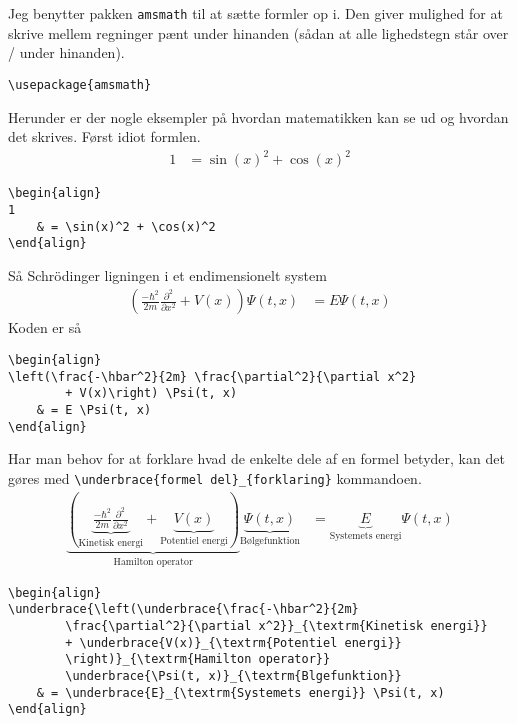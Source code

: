 \documentclass[11pt,a4paper,fleqn]{article}
\numberwithin{equation}{section}
\begin{document}
Jeg benytter pakken \verb!amsmath! til at sætte formler op i. 
Den giver mulighed for at skrive mellem regninger pænt under
hinanden (sådan at alle lighedstegn står over / under hinanden).
%
\begin{lstlisting}
\usepackage{amsmath}
\end{lstlisting}
%
Herunder er der nogle eksempler på hvordan matematikken kan se ud og
hvordan det skrives.
Først idiot formlen.
%
\begin{align}
1
	& = \sin(x)^2 + \cos(x)^2 
\end{align}
%
\begin{lstlisting}
\begin{align}
1
	& = \sin(x)^2 + \cos(x)^2 
\end{align}
\end{lstlisting}
%
Så Schrödinger ligningen i et endimensionelt system 
%
\begin{align}
\left(\frac{-\hbar^2}{2m} \frac{\partial^2}{\partial x^2} 
		+ V(x)\right) \Psi(t, x)
	& = E \Psi(t, x)
\end{align}
%
Koden er så
%
\begin{lstlisting}
\begin{align}
\left(\frac{-\hbar^2}{2m} \frac{\partial^2}{\partial x^2} 
		+ V(x)\right) \Psi(t, x)
	& = E \Psi(t, x)
\end{align}
\end{lstlisting}
%
Har man behov for at forklare hvad de enkelte dele af en formel
betyder, kan det gøres med 
\verb!\underbrace{formel del}_{forklaring}! kommandoen.
%
\begin{align}
\underbrace{\left(\underbrace{\frac{-\hbar^2}{2m} 
		\frac{\partial^2}{\partial x^2}}_{\textrm{Kinetisk energi}} 
		+ \underbrace{V(x)}_{\textrm{Potentiel energi}}
		\right)}_{\textrm{Hamilton operator}}
		\underbrace{\Psi(t, x)}_{\textrm{Bølgefunktion}}
	& = \underbrace{E}_{\textrm{Systemets energi}} \Psi(t, x)
\end{align}
%
\begin{lstlisting}
\begin{align}
\underbrace{\left(\underbrace{\frac{-\hbar^2}{2m} 
		\frac{\partial^2}{\partial x^2}}_{\textrm{Kinetisk energi}} 
		+ \underbrace{V(x)}_{\textrm{Potentiel energi}}
		\right)}_{\textrm{Hamilton operator}}
		\underbrace{\Psi(t, x)}_{\textrm{Blgefunktion}}
	& = \underbrace{E}_{\textrm{Systemets energi}} \Psi(t, x)
\end{align}
\end{lstlisting}



\end{document}
